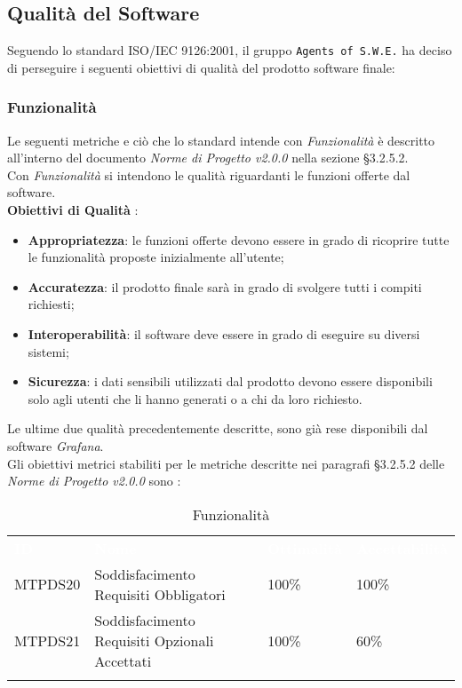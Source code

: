 \subsection{Qualità del Software}
\label{qs}
Seguendo lo standard ISO/IEC 9126:2001, il gruppo \texttt{Agents of S.W.E.} ha deciso di perseguire i seguenti obiettivi di qualità del prodotto software finale:


\subsubsection{Funzionalità}

Le seguenti metriche e ciò che lo standard intende con \textit{Funzionalità} è descritto all'interno del documento \textit{Norme di Progetto v2.0.0} nella sezione §3.2.5.2.\\

Con \textit{Funzionalità} si intendono le qualità riguardanti le funzioni offerte dal software.\\
\textbf{Obiettivi di Qualità} :
\begin{itemize}
	\item \textbf{Appropriatezza}: le funzioni offerte devono essere in grado di ricoprire tutte le funzionalità proposte inizialmente all'utente;
	\item \textbf{Accuratezza}: il prodotto finale sarà in grado di svolgere tutti i compiti richiesti;
	\item \textbf{Interoperabilità}: il software deve essere in grado di eseguire su diversi sistemi;
	\item \textbf{Sicurezza}: i dati sensibili utilizzati dal prodotto devono essere disponibili solo agli utenti che li hanno generati o a chi da loro richiesto. 
\end{itemize}
Le ultime due qualità precedentemente descritte, sono già rese disponibili dal software \textit{Grafana}. \\

Gli obiettivi metrici stabiliti per le metriche descritte nei paragrafi §3.2.5.2 delle \textit{Norme di Progetto v2.0.0} sono : 

\begin{longtable}{|C{.15\textwidth}|C{.24\textwidth}|C{.24\textwidth}|C{.24\textwidth}|}
\hline
{}\textbf{\textcolor{white}{ID}} & \textbf{\textcolor{white}{Nome}} & \textbf{\textcolor{white}{Ottimalità}} & \textbf{\textcolor{white}{Accettabilità}}\\
MTPDS20 & Soddisfacimento Requisiti Obbligatori & 100\% & 100\%\\
\hline
{}MTPDS21 & Soddisfacimento Requisiti Opzionali Accettati & 100\% & 60\% \\ 
\hline
\caption{Funzionalità}
\label{Funzionalità}
\end{longtable}

